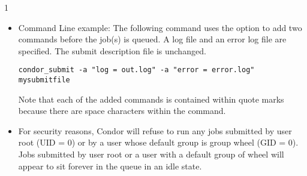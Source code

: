 \begin{ManPage}{\label{man-condor-submit}}{1}
\begin{itemize}
\begin{verbatim}
      ####################                                                    
      #                                                                       
      # Example 2: Show off some fancy features including
      # use of pre-defined macros and logging.                                
      #                                                                       
      ####################                                                    
                                                                          
      Executable     = foo                                                    
      Universe       = standard
      Requirements   = Memory >= 32 && OpSys == "IRIX6" && Arch =="SGI"     
      Rank           = Memory >= 64
      Image_Size     = 28 Meg                                                 
                                                                          
      Error   = err.$(Process)                                                
      Input   = in.$(Process)                                                 
      Output  = out.$(Process)                                                
      Log = foo.log                                                                       
                                                                          
      Queue 150
\end{verbatim}

\item{Command Line example:} The following command uses the
 option to add two commands before the job(s) is queued.
A log file and an error log file are specified.
The submit description file is unchanged.
\begin{verbatim}
condor_submit -a "log = out.log" -a "error = error.log" mysubmitfile
\end{verbatim}
Note that each of the added commands is contained within quote marks
because there are space characters within the command.
\end{itemize} 


\GenRem
\begin{itemize}

\item For security reasons, Condor will refuse to run any jobs submitted
by user root (UID = 0) or by a user whose default group is group wheel
(GID = 0). Jobs submitted by user root or a user with a default group of
wheel will appear to sit forever in the queue in an idle state. 


\end{itemize}
\end{ManPage}
